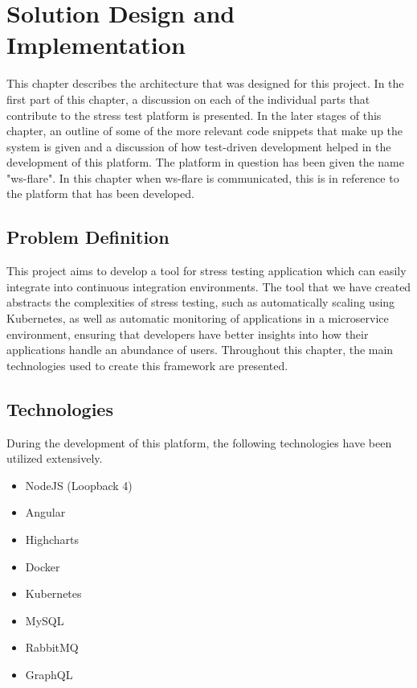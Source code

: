 \chapter{Solution Design and Implementation}

This chapter describes the architecture that was designed for this project. In the first part of this chapter, a discussion on each of the individual parts that contribute to the stress test platform is presented. In the later stages of this chapter, an outline of some of the more relevant code snippets that make up the system is given and a discussion of how test-driven development helped in the development of this platform. The platform in question has been given the name "ws-flare". In this chapter when ws-flare is communicated, this is in reference to the platform that has been developed.

\section{Problem Definition}

This project aims to develop a tool for stress testing application which can easily integrate into continuous integration environments. The tool that we have created abstracts the complexities of stress testing, such as automatically scaling using Kubernetes, as well as automatic monitoring of applications in a microservice environment, ensuring that developers have better insights into how their applications handle an abundance of users. Throughout this chapter, the main technologies used to create this framework are presented.

\section{Technologies}

During the development of this platform, the following technologies have been utilized extensively.

\begin{itemize}
  \item NodeJS (Loopback 4)
  \item Angular
  \item Highcharts
  \item Docker
  \item Kubernetes
  \item MySQL
  \item RabbitMQ
  \item GraphQL
\end{itemize}

